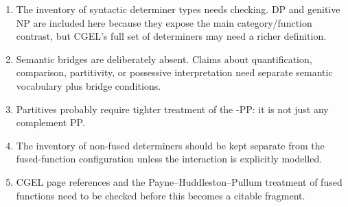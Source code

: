 \documentclass[11pt]{article}
\begin{document}
\begin{enumerate}[label=(\alph*),leftmargin=2em,itemsep=0.25em]
  \item The inventory of syntactic determiner types needs checking. DP and
        genitive NP are included here because they expose the main
        category/function contrast, but CGEL's full set of determiners may need
        a richer definition.
  \item Semantic bridges are deliberately absent. Claims about quantification,
        comparison, partitivity, or possessive interpretation need separate
        semantic vocabulary plus bridge conditions.
  \item Partitives probably require tighter treatment of the -PP:
        it is not just any complement PP.
  \item The inventory of non-fused determiners should be kept separate from the
        fused-function configuration unless the interaction is
        explicitly modelled.
  \item CGEL page references and the Payne--Huddleston--Pullum treatment of
        fused functions need to be checked before this becomes a citable
        fragment.
\end{enumerate}
\end{document}
